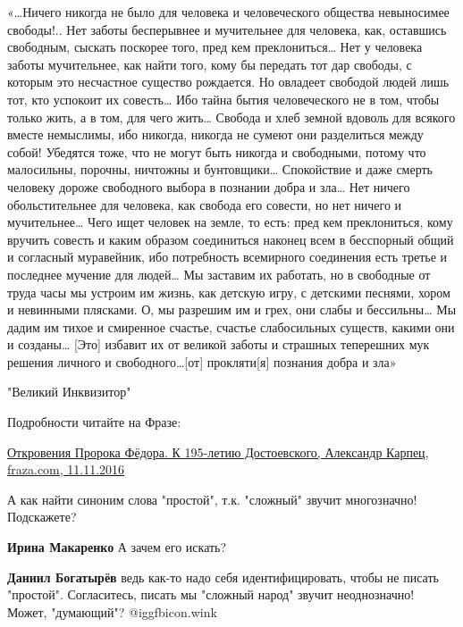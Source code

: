 \begin{itemize}
\begin{itemize}
«…Ничего никогда не было для человека и человеческого общества невыносимее
свободы!.. Нет заботы бесперывнее и мучительнее для человека, как, оставшись
свободным, сыскать поскорее того, пред кем преклониться… Нет у человека заботы
мучительнее, как найти того, кому бы передать тот дар свободы, с которым это
несчастное существо рождается. Но овладеет свободой людей лишь тот, кто
успокоит их совесть… Ибо тайна бытия человеческого не в том, чтобы только жить,
а в том, для чего жить… Свобода и хлеб земной вдоволь для всякого вместе
немыслимы, ибо никогда, никогда не сумеют они разделиться между собой! Убедятся
тоже, что не могут быть никогда и свободными, потому что малосильны, порочны,
ничтожны и бунтовщики… Спокойствие и даже смерть человеку дороже свободного
выбора в познании добра и зла… Нет ничего обольстительнее для человека, как
свобода его совести, но нет ничего и мучительнее… Чего ищет человек на земле,
то есть: пред кем преклониться, кому вручить совесть и каким образом
соединиться наконец всем в бесспорный общий и согласный муравейник, ибо
потребность всемирного соединения есть третье и последнее мучение для людей… Мы
заставим их работать, но в свободные от труда часы мы устроим им жизнь, как
детскую игру, с детскими песнями, хором и невинными плясками. О, мы разрешим им
и грех, они слабы и бессильны… Мы дадим им тихое и смиренное счастье, счастье
слабосильных существ, какими они и созданы… [Это] избавит их от великой заботы
и страшных теперешних мук решения личного и свободного…[от] прокляти[я]
познания добра и зла»

"Великий Инквизитор"

Подробности читайте на Фразе:

\href{https://fraza.com/analytics/254181-otkrovenija-proroka-fedora-k-195-letiju-dostoevskogo-}{%
Откровения Пророка Фёдора. К 195-летию Достоевского,  Александр Карпец, fraza.com, 11.11.2016%
}

\end{itemize} %


А как найти синоним слова "простой", т.к. "сложный" звучит многозначно!
Подскажете?

\begin{itemize} %
\textbf{Ирина Макаренко} А зачем его искать?

\textbf{Даниил Богатырёв} ведь как-то надо себя идентифицировать, чтобы не писать "простой". Согласитесь, писать мы "сложный народ" звучит неоднозначно!
Может, "думающий"? @igg{fbicon.wink} 


\end{itemize}
\end{itemize}
